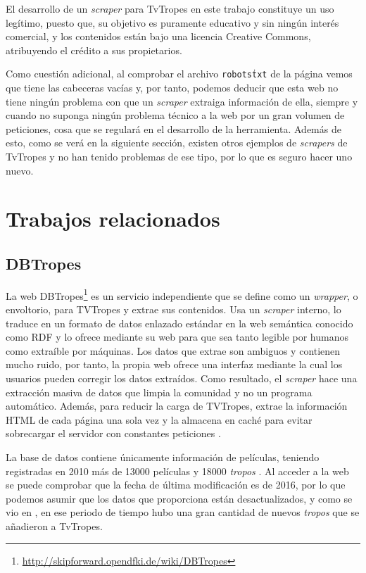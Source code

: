 El desarrollo de un \textit{scraper} para TvTropes en este trabajo constituye un
uso legítimo, puesto que, su objetivo es puramente educativo y sin ningún
interés comercial, y los contenidos están bajo una licencia Creative Commons,
atribuyendo el crédito a sus propietarios. 

Como cuestión adicional, al comprobar el archivo \texttt{robots\.txt} de la
página vemos que tiene las cabeceras vacías y, por tanto, podemos deducir que
esta web no tiene ningún problema con que un \textit{scraper} extraiga
información de ella, siempre y cuando no suponga ningún problema técnico a la
web por un gran volumen de peticiones, cosa que se regulará en el desarrollo de
la herramienta. Además de esto, como se verá en la siguiente sección, existen
otros ejemplos de \textit{scrapers} de TvTropes y no han tenido problemas de ese
tipo, por lo que es seguro hacer uno nuevo.

\section{Trabajos relacionados}
\subsection{DBTropes}
La web DBTropes\footnote{\url{http://skipforward.opendfki.de/wiki/DBTropes}} es
un servicio independiente que se define como un \textit{wrapper}, o envoltorio,
para TVTropes y extrae sus contenidos. Usa un \textit{scraper} interno, lo
traduce en un formato de datos enlazado estándar en la web semántica conocido
como RDF y lo ofrece mediante su web para que sea tanto legible por humanos como
extraíble por máquinas. Los datos que extrae son ambiguos y contienen mucho
ruido, por tanto, la propia web ofrece una interfaz mediante la cual los
usuarios pueden corregir los datos extraídos. Como resultado, el
\textit{scraper} hace una extracción masiva de datos que limpia la comunidad y
no un programa automático. Además, para reducir la carga de TVTropes, extrae la
información HTML de cada página una sola vez y la almacena en caché para evitar
sobrecargar el servidor con constantes peticiones \cite{kiesel2010dbtropes}.

La base de datos contiene únicamente información de películas, teniendo
registradas en 2010 más de 13000 películas y 18000 \textit{tropos}
\cite{kiesel2010dbtropes}. Al acceder a la web se puede comprobar que la fecha
de última modificación es de 2016, por lo que podemos asumir que los datos que
proporciona están desactualizados, y como se vio en \cite{garcia2020tropes}, en
ese periodo de tiempo hubo una gran cantidad de nuevos \textit{tropos} que se
añadieron a TvTropes.

